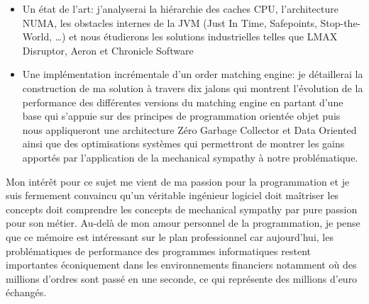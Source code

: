 \begin{itemize}
  \item Un état de l'art: j'analyserai la hiérarchie des caches CPU, l'architecture NUMA, les obstacles internes de la JVM (Just In Time, Safepoints, Stop-the-World, \dots) et nous étudierons les solutions industrielles telles que LMAX Disruptor, Aeron et Chronicle Software
  \item Une implémentation incrémentale d'un order matching engine: je détaillerai la construction de ma solution à travers dix jalons qui montrent l'évolution de la performance des différentes versions du matching engine en partant d'une base qui s'appuie sur des principes de programmation orientée objet puis nous appliqueront une architecture Zéro Garbage Collector et Data Oriented ainsi que des optimisations systèmes qui permettront de montrer les gains apportés par l'application de la mechanical sympathy à notre problématique.
\end{itemize}

Mon intérêt pour ce sujet me vient de ma passion pour la programmation et je suis fermement convaincu qu'un véritable ingénieur logiciel doit maîtriser les concepts doit comprendre les concepts de mechanical sympathy par pure passion pour son métier. Au-delà de mon amour personnel de la programmation, je pense que ce mémoire est intéressant sur le plan professionnel car aujourd'hui, les problématiques de performance des programmes informatiques restent importantes éconiquement dans les environnements financiers notamment où des millions d'ordres sont passé en une seconde, ce qui représente des millions d'euro échangés. 